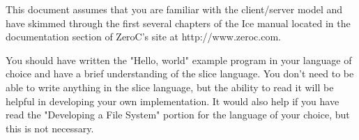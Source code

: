 This document assumes that you are familiar with the client/server model and have skimmed through the first several chapters of the Ice manual located in the documentation section of ZeroC's site at http://www.zeroc.com.

You should have written the "Hello, world" example program in your language of choice and have a brief understanding of the slice language. You don't need to be able to write anything in the slice language, but the ability to read it will be helpful in developing your own implementation. It would also help if you have read the "Developing a File System" portion for the language of your choice, but this is not necessary.
